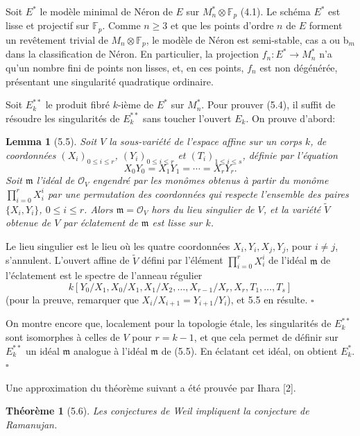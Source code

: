 \documentclass[10pt]{article}
\newcommand{\F}{\mathbb F}
\newcommand{\cO}{\mathcal O}
\newcommand{\QED}{\hfill$\square$}
\newtheorem*{theorem}{Théorème}
\newtheorem*{lemma}{Lemma}
\begin{document}
Soit $E^*$ le modèle minimal de Néron de $E$ sur $M_n^*\otimes\F_p$ (4.1). Le schéma $E^*$ est lisse et projectif sur $\F_p$. Comme $n\ge3$ et que les points d'ordre $n$ de $E$ forment un revêtement trivial de $M_n\otimes\F_p$, le modèle de Néron est semi-stable, cas a ou b$_m$ dans la classification de Néron. En particulier, la projection $f_n:E^*\to M_n^*$ n'a qu'un nombre fini de points non lisses, et, en ces points, $f_n$ est non dégénérée, présentant une singularité quadratique ordinaire.

Soit $E_k^{**}$ le produit fibré $k$-ième de $E^*$ sur $M_n^*$. Pour prouver (5.4), il suffit de résoudre les singularités de $E_k^{**}$ sans toucher l'ouvert $E_k$. On prouve d'abord:

\begin{lemma}[5.5]
Soit $V$ la sous-variété de l'espace affine sur un corps $k$, de coordonnées $(X_i)_{0\le i\le r}$, $(Y_i)_{0\le i\le r}$ et $(T_i)_{1\le i\le s}$, définie par l'équation
\[
X_0Y_0=X_1Y_1=\cdots=X_rY_r.
\]
Soit $\mathfrak m$ l'idéal de $\cO_V$ engendré par les monômes obtenus à partir du monôme $\prod_{i=0}^rX_i^i$ par une permutation des coordonnées qui respecte l'ensemble des paires $\{X_i,Y_i\}$, $0\le i\le r$. Alors $\mathfrak m=\cO_V$ hors du lieu singulier de $V$, et la variété $\widetilde V$ obtenue de $V$ par éclatement de $\mathfrak m$ est lisse sur $k$.
\end{lemma}

Le lieu singulier est le lieu où les quatre coordonnées $X_i,Y_i,X_j,Y_j$, pour $i\ne j$, s'annulent. L'ouvert affine de $\widetilde V$ défini par l'élément $\prod_{i=0}^rX_i^i$ de l'idéal $\mathfrak m$ de l'éclatement est le spectre de l'anneau régulier
\[
k[Y_0/X_1,X_0/X_1,X_1/X_2,\ldots,X_{r-1}/X_r,X_r,T_1,\ldots,T_s]
\]
(pour la preuve, remarquer que $X_i/X_{i+1}=Y_{i+1}/Y_i$), et 5.5 en résulte. \QED

On montre encore que, localement pour la topologie étale, les singularités de $E_k^{**}$ sont isomorphes à celles de $V$ pour $r=k-1$, et que cela permet de définir sur $E_k^{**}$ un idéal $\mathfrak m$ analogue à l'idéal $\mathfrak m$ de (5.5). En éclatant cet idéal, on obtient $E_k^*$. \QED

Une approximation du théorème suivant a été prouvée par Ihara [2].

\begin{theorem}[5.6]
Les conjectures de Weil impliquent la conjecture de Ramanujan.
\end{theorem}
\end{document}
